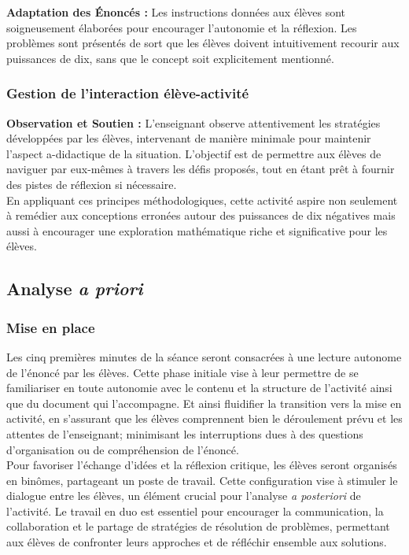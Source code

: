 \textbf{Adaptation des Énoncés :}
Les instructions données aux élèves sont soigneusement élaborées pour encourager l'autonomie et la réflexion.
Les problèmes sont présentés de sort que les élèves doivent intuitivement recourir aux puissances de dix,
sans que le concept soit explicitement mentionné.

\subsubsection{Gestion de l'interaction élève-activité}

\textbf{Observation et Soutien :}
L'enseignant observe attentivement les stratégies développées par les élèves,
intervenant de manière minimale pour maintenir l'aspect a-didactique de la situation.
L'objectif est de permettre aux élèves de naviguer par eux-mêmes à travers les défis proposés,
tout en étant prêt à fournir des pistes de réflexion si nécessaire.\\

En appliquant ces principes méthodologiques,
cette activité aspire non seulement à remédier aux conceptions erronées autour des puissances de dix négatives mais aussi à encourager une exploration mathématique riche et significative pour les élèves.

\subsection{Analyse \textit{a priori}}

\subsubsection{Mise en place}

Les cinq premières minutes de la séance seront consacrées à une lecture autonome de l'énoncé par les élèves.
Cette phase initiale vise à leur permettre de se familiariser en toute autonomie avec le contenu et la structure de l'activité ainsi que du document qui l'accompagne.
Et ainsi fluidifier la transition vers la mise en activité,
en s'assurant que les élèves comprennent bien le déroulement prévu et les attentes de l'enseignant;
minimisant les interruptions dues à des questions d'organisation ou de compréhension de l'énoncé.\\

Pour favoriser l'échange d'idées et la réflexion critique,
les élèves seront organisés en binômes,
partageant un poste de travail.
Cette configuration vise à stimuler le dialogue entre les élèves,
un élément crucial pour l'analyse \textit{a posteriori} de l'activité.
Le travail en duo est essentiel pour encourager la communication,
la collaboration et le partage de stratégies de résolution de problèmes,
permettant aux élèves de confronter leurs approches et de réfléchir ensemble aux solutions.\\

